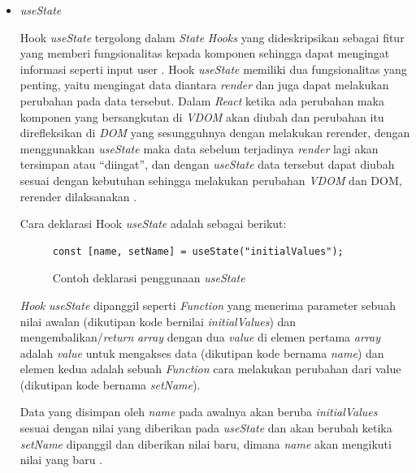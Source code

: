\documentclass[a4paper]{article}
\begin{document}
\begin{enumerate}[label=\alph*. ]
\begin{enumerate}
\begin{itemize}
                        \item \textit{useState}

                        Hook \textit{useState} tergolong dalam \textit{State} \textit{Hooks} yang dideskripsikan sebagai fitur yang memberi fungsionalitas kepada komponen sehingga dapat mengingat informasi seperti input user \autocite[190-196]{Banks_Porcello_2020}. Hook \textit{useState} memiliki dua fungsionalitas yang penting, yaitu mengingat data diantara \textit{render} dan juga dapat melakukan perubahan pada data tersebut. Dalam \textit{React} ketika ada perubahan maka komponen yang bersangkutan di \textit{VDOM} akan diubah dan perubahan itu direfleksikan di \textit{DOM} yang sesungguhnya dengan melakukan rerender, dengan menggunakkan \textit{useState} maka data sebelum terjadinya \textit{render} lagi akan tersimpan atau “diingat”, dan dengan \textit{useState} data tersebut dapat diubah sesuai dengan kebutuhan sehingga melakukan perubahan \textit{VDOM} dan DOM, rerender dilaksanakan \autocite{React_useState}.

                        Cara deklarasi Hook \textit{useState} adalah sebagai berikut:

                        \begin{figure}[h]
                            \centering
                            \begin{lstlisting}[language=HTML]
const [name, setName] = useState("initialValues");
                            \end{lstlisting}
                            \caption{Contoh deklarasi penggunaan \textit{useState}}
                        \end{figure}

                        \textit{Hook} \textit{useState} dipanggil seperti \textit{Function} yang menerima parameter sebuah nilai awalan (dikutipan kode bernilai \textit{initialValues}) dan mengembalikan/\textit{return} \textit{array} dengan dua \textit{value} di elemen pertama \textit{array} adalah \textit{value} untuk mengakses data (dikutipan kode bernama \textit{name}) dan elemen kedua adalah sebuah \textit{Function} cara melakukan perubahan dari value (dikutipan kode bernama \textit{setName}).

                        Data yang disimpan oleh \textit{name} pada awalnya akan beruba \textit{initialValues} sesuai dengan nilai yang diberikan pada \textit{useState} dan akan berubah ketika \textit{setName} dipanggil dan diberikan nilai baru, dimana \textit{name} akan mengikuti nilai yang baru \autocite{React_useState}.


\end{itemize}
\end{enumerate}
\end{enumerate}
\end{document}
